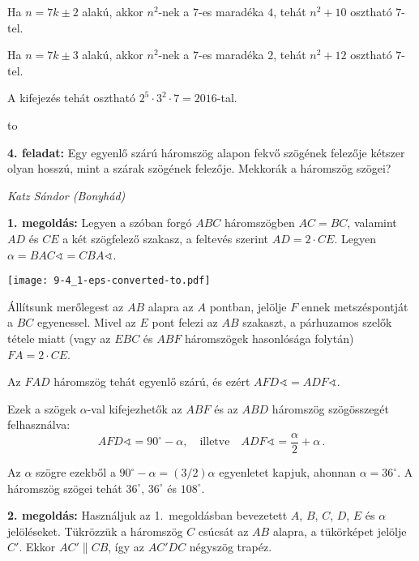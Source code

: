 \documentclass[a4paper,10pt]{article}
\newcommand{\ki}[2]{\hfill {\it #1 (#2)}\medskip}
\newcommand{\vonal}{\hbox to \hsize{\hskip2truecm\hrulefill\hskip2truecm}}
\begin{document}
\noindent Ha  $n=7k\pm2$ alakú, akkor $n^2$-nek a $7$-es maradéka $4$, tehát $n^2+10$ osztható $7$-tel.

\noindent Ha  $n=7k\pm3$ alakú, akkor $n^2$-nek a $7$-es maradéka $2$, tehát $n^2+12$ osztható $7$-tel. 

\smallskip

\noindent A kifejezés tehát osztható $2^5\cdot 3^2\cdot7 = 2016$-tal.


\vonal 

{\bf 4. feladat: } Egy egyenlő szárú háromszög alapon fekvő szögének felezője kétszer olyan hosszú, mint a szárak szögének felezője. Mekkorák a háromszög szögei?

\ki{Katz Sándor}{Bonyhád}\medskip

{\bf 1. megoldás: } Legyen a szóban forgó $ABC$ háromszögben $AC=BC$, valamint $AD$ és $CE$ a két szögfelező szakasz, a feltevés szerint $AD=2\cdot CE$. Legyen $\alpha =BAC\sphericalangle =CBA\sphericalangle$. 

\begin{center}
\texttt{[image: 9-4\_1-eps-converted-to.pdf]}
\end{center}

\noindent Állítsunk merőlegest az $AB$ alapra az $A$ pontban, jelölje $F$ ennek metszéspontját a $BC$ egyenessel. Mivel az $E$ pont felezi az $AB$ szakaszt, a párhuzamos szelők tétele miatt (vagy az $EBC$ és $ABF$ háromszögek hasonlósága folytán) $FA=2\cdot CE$. 


\smallskip

\noindent Az $FAD$ háromszög tehát egyenlő szárú, és ezért $AFD\sphericalangle =ADF\sphericalangle$. 

\smallskip

\noindent Ezek a szögek $\alpha$-val kifejezhetők az $ABF$ és az $ABD$ háromszög szögösszegét felhasználva:
\[AFD\sphericalangle =90^{\circ} -\alpha ,\quad\text{illetve}\quad ADF\sphericalangle =\frac{\alpha}{2}+\alpha\,.\]%

\noindent Az $\alpha$ szögre ezekből a $90^{\circ} -\alpha =(3/2)\alpha$ egyenletet kapjuk, ahonnan $\alpha =36^{\circ}$. A háromszög szögei tehát $36^{\circ}$, $36^{\circ}$ és $108^{\circ}$. 

\medskip

{\bf 2. megoldás: } Használjuk az 1.~megoldásban bevezetett $A$, $B$, $C$, $D$, $E$ és $\alpha$ jelöléseket. Tükrözzük a háromszög $C$ csúcsát az $AB$ alapra, a tükörképet jelölje $C'$. Ekkor $AC'\parallel CB$, így az $AC'DC$ négyszög trapéz. 
\end{document}
